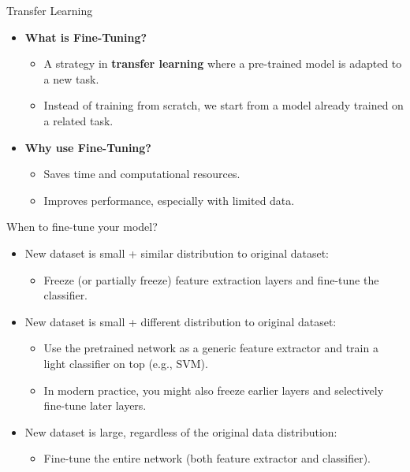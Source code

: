 \begin{frame}[allowframebreaks]{Transfer Learning}
\begin{itemize}
    \item \textbf{What is Fine-Tuning?}  
    \begin{itemize}
        \item A strategy in \textbf{transfer learning} where a pre-trained model is adapted to a new task.
        \item Instead of training from scratch, we start from a model already trained on a related task.
    \end{itemize}
    \item \textbf{Why use Fine-Tuning?}  
    \begin{itemize}
        \item Saves time and computational resources.
        \item Improves performance, especially with limited data.
    \end{itemize}
\end{itemize}
\end{frame}

\begin{frame}[allowframebreaks]{When to fine-tune your model?}
    \begin{itemize}
        \item New dataset is small + similar distribution to original dataset:
        \begin{itemize}
            \item Freeze (or partially freeze) feature extraction layers and fine-tune the classifier.
        \end{itemize}
        \item New dataset is small + different distribution to original dataset:
        \begin{itemize}
            \item Use the pretrained network as a generic feature extractor and train a light classifier on top (e.g., SVM).
            \item In modern practice, you might also freeze earlier layers and selectively fine-tune later layers.
        \end{itemize}
        \item New dataset is large, regardless of the original data distribution:
        \begin{itemize}
            \item Fine-tune the entire network (both feature extractor and classifier).
        \end{itemize}
    \end{itemize}
\end{frame}

